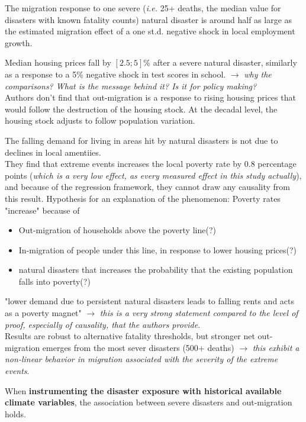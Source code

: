 \documentclass[11pt, oneside]{article}   	%
\begin{document}
The migration response to one severe (\textit{i.e.} 25+ deaths, the median value for disasters with known fatality counts) natural disaster is around half as large as the estimated migration effect of a one st.d. negative shock in local employment growth. 

Median housing prices fall by $[2.5 ; 5]$\% after a severe natural disaster, similarly as a response to a 5\% negative shock in test scores in school. $\to$ \textit{why the comparisons? What is the message behind it? Is it for policy making?} \\

Authors don't find that out-migration is a response to rising housing prices that would follow the destruction of the housing stock. At the decadal level, the housing stock adjusts to follow population variation.

The falling demand for living in areas hit by natural disasters is not due to declines in local amentiies. \\

They find that extreme events increases the local poverty rate by 0.8 percentage points (\textit{which is a very low effect, as every measured effect in this study actually}), and because of the regression framework, they cannot draw any causality from this result. Hypothesis for an explanation of the phenomenon: Poverty rates "increase" because of
\begin{itemize}
    \item Out-migration of households above the poverty line(?)
    \item In-migration of people under this line, in response to lower housing prices(?)
    \item natural disasters that increases the probability that the existing population falls into poverty(?)
\end{itemize}

"lower demand due to persistent natural disasters leads to falling rents and acts as a poverty magnet" $\to$ \textit{this is a very strong statement compared to the level of proof, especially of causality, that the authors provide}. \\

Results are robust to alternative fatality thresholds, but stronger net out-migration emerges from the most sever disasters (500+ deaths) $\to$ \textit{this exhibit a non-linear behavior in migration associated with the severity of the extreme events}.

When \textbf{instrumenting the disaster exposure with historical available climate variables}, the association between severe disasters and out-migration holds. \\
\end{document}
